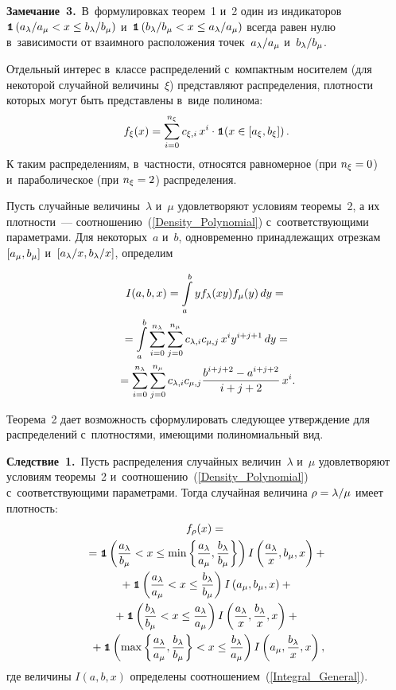 \begin{multicols}{2}
\noindent
\textbf{Замечание~3.}\ 
В~формулировках теорем~1 и~2 один из индикаторов 
$\mbox{{\small \tt {1}}\hspace{-1.3mm}{\tt 1}}\left({a_\lambda}/{a_\mu}<x\le{b_\lambda}/{b_\mu}\right)$ 
и~$\mbox{{\small \tt {1}}\hspace{-1.3mm}{\tt 1}}\left({b_\lambda}/{b_\mu}<x\le{a_\lambda}/{a_\mu}\right)$ всегда равен нулю 
в~зависимости от взаимного расположения точек~$a_\lambda/a_\mu$ и~$b_\lambda/b_\mu$.

\smallskip


Отдельный интерес в~классе распределений с~компактным носителем 
(для некоторой случайной величины~$\xi$) представляют распределения, 
плотности которых могут быть представлены в~виде полинома:
\begin{equation}\label{Density_Polynomial}
f_\xi(x)=\sum\limits_{i=0}^{n_\xi}c_{\xi,i}\, x^i\cdot\mbox{{\small \tt {1}}\hspace{-1.3mm}{\tt 1}}(x\in[a_\xi,b_\xi])\,.
\end{equation}
К таким распределениям, в~частности, относятся равномерное (при $n_\xi\hm=0$) 
и~параболическое (при $n_\xi\hm=2$) распределения.

Пусть случайные величины~$\lambda$ и~$\mu$ удовлетворяют условиям теоремы~2, 
а их плотности~--- соотношению~(\ref{Density_Polynomial}) 
с~соответствующими параметрами. Для некоторых~$a$ и~$b$, одновременно 
принадлежащих отрезкам $[a_\mu,b_\mu]$ и~$[a_\lambda/x,b_\lambda/x]$, определим

\noindent
\begin{multline}
I(a,b,x)=\int\limits_{a}^{b}{y}f_\lambda(xy)f_\mu(y)\, dy={}\\
{}=
\int\limits_{a}^{b}\sum\limits_{i=0}^{n_\lambda}\sum\limits_{j=0}^{n_\mu}
c_{\lambda,i}c_{\mu,j}\, x^{i}y^{i+j+1}\, dy={}\\
{}=\sum\limits_{i=0}^{n_\lambda}\sum\limits_{j=0}^{n_\mu}c_{\lambda,i}c_{\mu,j}
\displaystyle\frac{\displaystyle b^{i+j+2}-a^{i+j+2}\mathstrut}{\displaystyle i+j+2\mathstrut}\, x^i.
\label{Integral_General}
\end{multline}

Теорема~2 дает возможность сформулировать следующее утверждение для 
распределений с~плотностями, имеющими полиномиальный вид.

\smallskip

\noindent
\textbf{Следствие~1.}\ Пусть распределения случайных величин~$\lambda$ и~$\mu$ 
удовлетворяют условиям теоремы~2 и~соотношению~(\ref{Density_Polynomial}) 
с~соответствующими пара\-мет\-рами. Тогда случайная величина $\rho\hm=\lambda/\mu$ 
имеет плотность:
\begin{multline}
f_\rho(x)={}\\
{}=\Ik\left(\fr{\al}{\bmm}<x\le\min\left\{\fr{\al}{\am},\fr{\bll}{\bmm}\right\}
\right)I\left(\fr{\al}{x},\bmm,x\right)+{}\\
{}+\Ik\left(\fr{\al}{\am}<x\le\fr{\bll}{\bmm}\right)I\left(\am,\bmm,x\right)+{}\\
{}+
\Ik\left(\fr{\bll}{\bmm}<x\le\fr{\al}{\am}\right)I\left(
\fr{\al}{x},\fr{\bll}{x},x\right)+{}\\
\!{}+\Ik\left(\max\left\{\fr{\al}{\am},\fr{\bll}{\bmm}\right\}<x\le\fr{\bll}{\am}\right)
I\left(\am,\fr{\bll}{x},x\right),\!\!
\label{Density_rho_Polynomial_case}
\end{multline}
где величины $I(a,b,x)$ определены соотношением~(\ref{Integral_General}).


\end{multicols}
